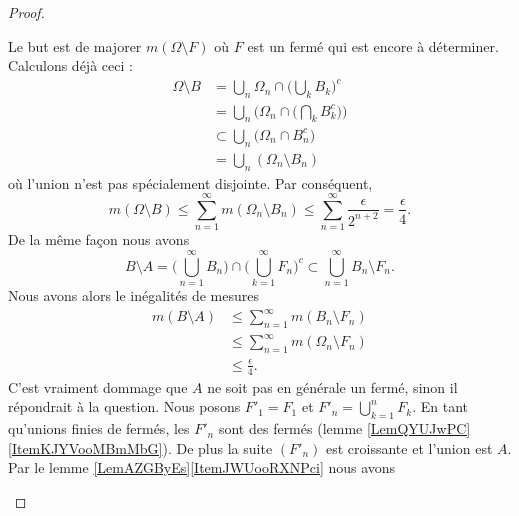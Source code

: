 \begin{proof}
\begin{subproof}
\begin{subproof}
                    Le but est de majorer \( m(\Omega\setminus F)\) où \( F\) est un fermé qui est encore à déterminer. Calculons déjà ceci :
                    \begin{subequations}
                        \begin{align}
                            \Omega\setminus B&=\bigcup_n\Omega_n\cap\big( \bigcup_kB_k \big)^c\\
                            &=\bigcup_n\Big( \Omega_n\cap\big( \bigcap_kB_k^c \big) \Big)\\
                            &\subset\bigcup_n\big( \Omega_n\cap B_n^c \big)\\
                            &=\bigcup_n(\Omega_n\setminus B_n)
                        \end{align}
                    \end{subequations}
                    où l'union n'est pas spécialement disjointe. Par conséquent,
                    \begin{equation}
                        m(\Omega\setminus B)\leq \sum_{n=1}^{\infty}m(\Omega_n\setminus B_n)\leq \sum_{n=1}^{\infty}\frac{ \epsilon }{ 2^{n+2} }=\frac{ \epsilon }{ 4 }.
                    \end{equation}
                    De la même façon nous avons
                    \begin{equation}
                        B\setminus A=\big( \bigcup_{n=1}^{\infty}B_n \big)\cap\big( \bigcup_{k=1}^{\infty}F_n \big)^c\subset \bigcup_{n=1}^{\infty}B_n\setminus F_n.
                    \end{equation}
                    Nous avons alors le inégalités de mesures
                    \begin{subequations}
                        \begin{align}
                            m(B\setminus A)&\leq \sum_{n=1}^{\infty}m(B_n\setminus F_n)\\
                            &\leq\sum_{n=1}^{\infty}m(\Omega_n\setminus F_n)\\
                            &\leq \frac{ \epsilon }{ 4 }.
                        \end{align}
                    \end{subequations}
                    C'est vraiment dommage que \( A\) ne soit pas en générale un fermé, sinon il répondrait à la question. Nous posons \( F'_1=F_1\) et \( F'_n=\bigcup_{k=1}^nF_k\). En tant qu'unions finies de fermés, les \( F'_n\) sont des fermés (lemme \ref{LemQYUJwPC}\ref{ItemKJYVooMBmMbG}). De plus la suite \( (F'_n)\)  est croissante et l'union est \( A\). Par le lemme \ref{LemAZGByEs}\ref{ItemJWUooRXNPci} nous avons

\end{subproof}
\end{subproof}
\end{proof}
